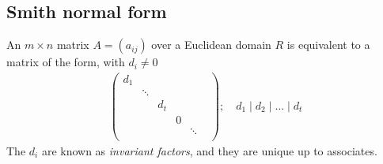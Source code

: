 \subsection{Smith normal form}
\begin{theorem}
	An $m \times n$ matrix $A = (a_{ij})$ over a Euclidean domain $R$ is equivalent to a matrix of the form, with $d_i \neq 0$
	\begin{align*}
		\begin{pmatrix}
			d_1                            \\
			 & \ddots                      \\
			 &        & d_t                \\
			 &        &     & 0            \\
			 &        &     &   & \ddots   \\
			 &        &     &   &        &
		\end{pmatrix};\quad d_1 \mid d_2 \mid \dots \mid d_t
	\end{align*}
	The $d_i$ are known as \textit{invariant factors}, and they are unique up to associates.
\end{theorem}

